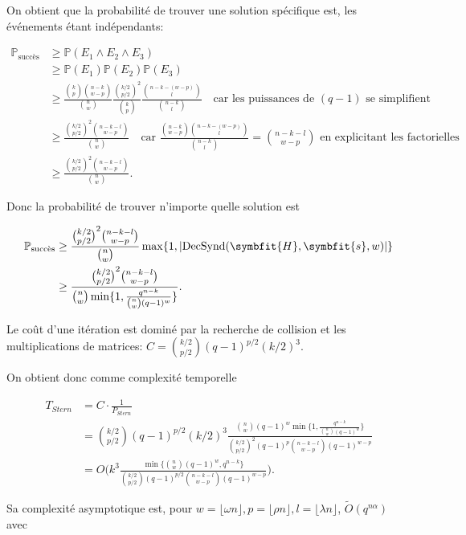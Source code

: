 \documentclass{scrartcl}[a4paper,9pt,headings=small,footinclude=false]
\theoremstyle{definition}
\theoremstyle{remark}
\begin{document}
On obtient que la probabilité de trouver une solution spécifique est, les événements étant indépendants:

\begin{align*}
\mathbb{P}_{\text{succès}} &\geq \mathbb{P}(E_1 \wedge E_2 \wedge E_3)\\
&\geq \mathbb{P}(E_1) \mathbb{P}(E_2) \mathbb{P}(E_3) \\
&\geq \frac{\binom{k}{p}\binom{n-k}{w-p}}{\binom{n}{w}} \frac{\binom{k/2}{p/2}^2}{\binom{k}{p}} \frac{\binom{n-k-(w-p)}{l}}{\binom{n-k}{l}} \quad \text{car les puissances de } (q-1) \text{ se simplifient}\\
&\geq \frac{\binom{k/2}{p/2}^2\binom{n-k-l}{w-p}}{\binom{n}{w}} \quad \text{car } \frac{\binom{n-k}{w-p}\binom{n-k-(w-p)}{l}}{\binom{n-k}{l}} = \binom{n-k-l}{w-p} \text{ en explicitant les factorielles}\\
&\geq \frac{\binom{k/2}{p/2}^2\binom{n-k-l}{w-p}}{\binom{n}{w}}.
\end{align*}

Donc la probabilité de trouver n'importe quelle solution est

\begin{align*}
\mathbb{P}_{\text{succès}} &\geq \frac{\binom{k/2}{p/2}^2\binom{n-k-l}{w-p}}{\binom{n}{w}}\max \{ 1, |\text{DecSynd}(\symbfit{H},\symbfit{s},w)| \}\\
&\geq \frac{\binom{k/2}{p/2}^2\binom{n-k-l}{w-p}}{\binom{n}{w} \min \{ 1, \frac{q^{n-k}}{\binom{n}{w}(q-1)^w} \}}.
\end{align*}

Le coût d'une itération est dominé par la recherche de collision et les multiplications de matrices: $C=\binom{k/2}{p/2}(q-1)^{p/2}(k/2)^3$.

On obtient donc comme complexité temporelle

\begin{align*}
	T_{Stern} &= C \cdot \frac{1}{P_{Stern}}\\
	&= \binom{k/2}{p/2}(q-1)^{p/2}(k/2)^3 \frac{\binom{n}{w}(q-1)^w \min \{ 1, \frac{q^{n-k}}{\binom{n}{w}(q-1)^w} \} }{\binom{k/2}{p/2}^2 (q-1)^p \binom{n-k-l}{w-p}(q-1)^{w-p}}\\
	&= O\Big(k^3 \frac{\min \{ \binom{n}{w}(q-1)^w, q^{n-k}\} }{\binom{k/2}{p/2} (q-1)^{p/2} \binom{n-k-l}{w-p}(q-1)^{w-p}}\Big).
\end{align*}

Sa complexité asymptotique est, pour $w=\lfloor \omega n \rfloor, p = \lfloor \rho n \rfloor, l= \lfloor \lambda  n \rfloor$, $\tilde{O}(q^{n\alpha})$ avec
\end{document}
